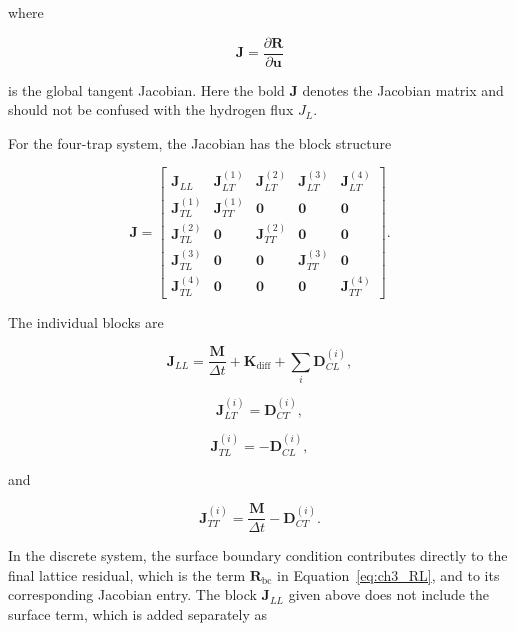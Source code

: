 \documentclass[a4paper,12pt,oneside]{report}
\begin{document}
where

\begin{equation}
\mathbf{J}
=
\frac{\partial\mathbf{R}}
{\partial\mathbf{u}}
\end{equation}

is the global tangent Jacobian. Here the bold $\mathbf{J}$ denotes the
Jacobian matrix and should not be confused with the hydrogen flux $J_L$.

For the four-trap system, the Jacobian has the block structure

\begin{equation}
\mathbf{J}
=
\begin{bmatrix}
\mathbf{J}_{LL}
&
\mathbf{J}_{LT}^{(1)}
&
\mathbf{J}_{LT}^{(2)}
&
\mathbf{J}_{LT}^{(3)}
&
\mathbf{J}_{LT}^{(4)}
\\
\mathbf{J}_{TL}^{(1)}
&
\mathbf{J}_{TT}^{(1)}
&
\mathbf{0}&\mathbf{0}&\mathbf{0}
\\
\mathbf{J}_{TL}^{(2)}
&
\mathbf{0}
&
\mathbf{J}_{TT}^{(2)}
&
\mathbf{0}&\mathbf{0}
\\
\mathbf{J}_{TL}^{(3)}
&
\mathbf{0}&\mathbf{0}
&
\mathbf{J}_{TT}^{(3)}
&
\mathbf{0}
\\
\mathbf{J}_{TL}^{(4)}
&
\mathbf{0}&\mathbf{0}&\mathbf{0}
&
\mathbf{J}_{TT}^{(4)}
\end{bmatrix}.
\label{eq:ch3_jacobian}
\end{equation}

The individual blocks are

\begin{equation}
\mathbf{J}_{LL}
=
\frac{\mathbf{M}}{\Delta t}
+
\mathbf{K}_{\mathrm{diff}}
+
\sum_i
\mathbf{D}_{CL}^{(i)},
\end{equation}

\begin{equation}
\mathbf{J}_{LT}^{(i)}
=
\mathbf{D}_{CT}^{(i)},
\end{equation}

\begin{equation}
\mathbf{J}_{TL}^{(i)}
=
-\mathbf{D}_{CL}^{(i)},
\end{equation}

and

\begin{equation}
\mathbf{J}_{TT}^{(i)}
=
\frac{\mathbf{M}}{\Delta t}
-
\mathbf{D}_{CT}^{(i)}.
\end{equation}

In the discrete system, the surface boundary condition contributes
directly to the final lattice residual, which is the term
$\mathbf{R}_{\mathrm{bc}}$ in Equation~\eqref{eq:ch3_RL}, and to its
corresponding Jacobian entry. The block $\mathbf{J}_{LL}$ given above
does not include the surface term, which is added separately as
\end{document}
